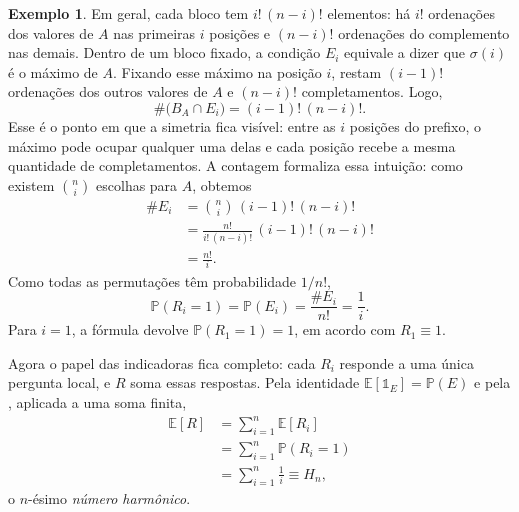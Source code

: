\documentclass[12pt,portuguese]{article}
\theoremstyle{definition}
\newtheorem{example}[example]{Exemplo}
\begin{document}
\begin{example}
Em geral, cada bloco tem $i!\,(n-i)!$ elementos: há $i!$ ordenações dos
valores de $A$ nas primeiras $i$ posições e $(n-i)!$ ordenações do
complemento nas demais. Dentro de um bloco fixado, a condição $E_i$ equivale
a dizer que $\sigma(i)$ é o máximo de $A$. Fixando esse máximo na posição
$i$, restam $(i-1)!$ ordenações dos outros valores de $A$ e $(n-i)!$
completamentos. Logo,
\[
\#\bigl(B_A\cap E_i\bigr)=(i-1)!\,(n-i)!.
\]
Esse é o ponto em que a simetria fica visível: entre as $i$ posições do
prefixo, o máximo pode ocupar qualquer uma delas e cada posição recebe a
mesma quantidade de completamentos. A contagem formaliza essa intuição:
como existem $\binom{n}{i}$ escolhas para $A$, obtemos
\begin{align*}
\#E_i
&=\binom{n}{i}\,(i-1)!\,(n-i)!
\\[0.2cm]
&=\frac{n!}{i!\,(n-i)!}\,(i-1)!\,(n-i)!
\\[0.2cm]
&=\frac{n!}{i}.
\end{align*}
Como todas as permutações têm probabilidade $1/n!$,
\[
\mathbb{P}(R_i=1)=\mathbb{P}(E_i)
=\frac{\#E_i}{n!}
=\frac{1}{i}.
\]
Para $i=1$, a fórmula devolve $\mathbb{P}(R_1=1)=1$, em acordo com
$R_1\equiv 1$.

Agora o papel das indicadoras fica completo: cada $R_i$ responde a uma única
pergunta local, e $R$ soma essas respostas. Pela identidade
$\mathbb{E}[\mathds{1}_E]=\mathbb{P}(E)$ e pela
, aplicada a uma soma finita,
\begin{align*}
\mathbb{E}[R]
&=\sum_{i=1}^n\mathbb{E}[R_i]
\\[0.3cm]
&=\sum_{i=1}^n\mathbb{P}(R_i=1)
\\[0.3cm]
&=\sum_{i=1}^n\frac{1}{i}
\equiv H_n,
\end{align*}
o $n$-ésimo \emph{número harmônico}.


\end{example}
\end{document}
